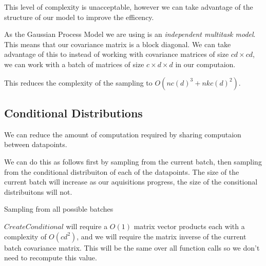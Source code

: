 \documentclass[12pt, a4paper]{report}
\theoremstyle{definition}
\begin{document}
This level of complexity is unacceptable, however we can take advantage of the structure of our model to improve the efficency.

As the Gaussian Process Model we are using is an \textit{independent multitask model}. This means that our covariance matrix is a block diagonal. We can take advantage of this to instead of working with covariance matrices of size $ cd \times cd $, we can work with a batch of matrices of size $c \times d \times d$ in our computaion.


This reduces the complexity of the sampling to $O(n c (d)^3  + n k c (d)^2)$.

\subsection{Conditional Distributions}

We can reduce the amount of computation required by sharing computaion between datapoints.

We can do this as follows first by sampling from the current batch, then sampling from the conditional distribuiton of each of the datapoints. The size of the current batch will increase as our aquisitions progress, the size of the consitional distribuitons will not.


\begin{algorithm}[H]
    \SetAlgoLined
     \caption{Sampling from all possible batches}
\end{algorithm}

$CreateConditional$ will require a $O(1)$ matrix vector products each with a complexity of $O(cd^2)$, and we will require the matrix inverse of the current batch covariance matrix. This will be the same over all function calls so we don't need to recompute this value.
\end{document}
